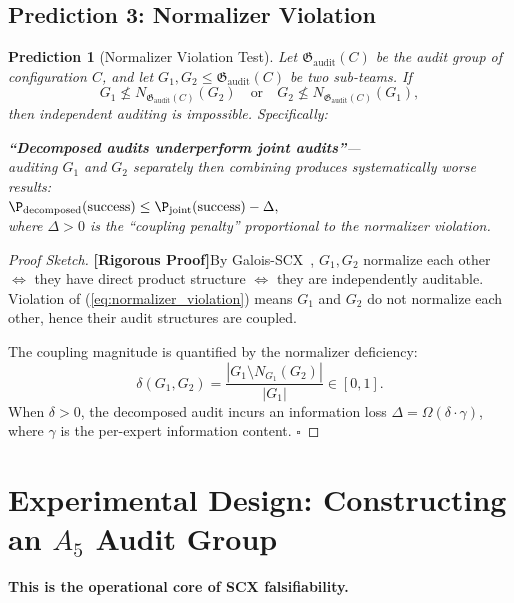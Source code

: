 \documentclass[12pt,a4paper]{article}
\newtheorem{prediction}[theorem]{Prediction}
\theoremstyle{remark}
\newcommand{\AuditGrp}{\mathfrak{G}_{\mathrm{audit}}}
\newcommand{\rigorous}{\textnormal{\textbf{[Rigorous Proof]}}}
\begin{document}
\subsection{Prediction 3: Normalizer Violation}
\begin{prediction}[Normalizer Violation Test]\label{pred:normalizer}
Let \(\AuditGrp(C)\) be the audit group of configuration \(C\), and let \(G_1, G_2 \leq \AuditGrp(C)\) be two sub-teams. If
\begin{equation}\label{eq:normalizer_violation}
    G_1 \not\leq N_{\AuditGrp(C)}(G_2) \quad\text{or}\quad G_2 \not\leq N_{\AuditGrp(C)}(G_1),
\end{equation}
then independent auditing is impossible. Specifically:
\begin{center}
    \textbf{``Decomposed audits underperform joint audits''}---\\
    auditing \(G_1\) and \(G_2\) separately then combining produces systematically worse results:\\
    \(\displaystyle\P_{\mathrm{decomposed}}(\text{success}) \leq
    \P_{\mathrm{joint}}(\text{success}) - \Delta,\)\\[4pt]
    where \(\Delta > 0\) is the ``coupling penalty'' proportional to the normalizer violation.
\end{center}
\end{prediction}
\begin{proof}[Proof Sketch]
\rigorous By Galois-SCX~\cite{scx2026galois}, \(G_1, G_2\) normalize each other \(\iff\) they have direct product structure \(\iff\) they are independently auditable. Violation of (\ref{eq:normalizer_violation}) means \(G_1\) and \(G_2\) do not normalize each other, hence their audit structures are coupled.

The coupling magnitude is quantified by the normalizer deficiency:
\[
    \delta(G_1, G_2) = \frac{|G_1 \setminus N_{G_1}(G_2)|}{|G_1|} \in [0, 1].
\]
When \(\delta > 0\), the decomposed audit incurs an information loss \(\Delta = \Omega(\delta \cdot \gamma)\), where \(\gamma\) is the per-expert information content. \(\square\)
\end{proof}
\section{Experimental Design: Constructing an \(A_5\) Audit Group}
\textbf{This is the operational core of SCX falsifiability.}
\end{document}
